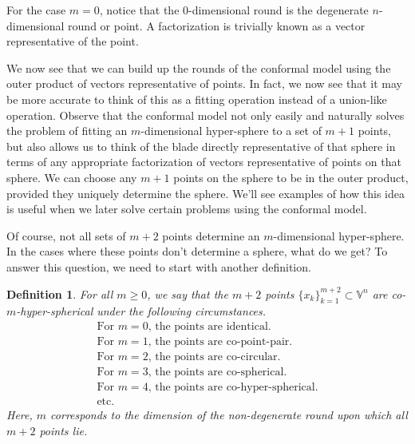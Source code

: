 \documentclass[12pt]{article}
\newcommand{\V}{\mathbb{V}}
\newtheorem{definition}{Definition}[section]
\begin{document}
For the case $m=0$, notice that the 0-dimensional round is the degenerate $n$-dimensional round
or point.  A factorization is trivially known as a vector representative of the point.

We now see that we can build up the rounds of the conformal model using
the outer product of vectors representative of points.  In fact, we now see
that it may be more accurate to think of this as a fitting operation instead of
a union-like operation.  Observe that the conformal model not only easily and
naturally solves the problem of fitting an $m$-dimensional hyper-sphere
to a set of $m+1$ points, but also allows us to think of the blade directly
representative of that sphere in terms of any appropriate factorization
of vectors representative of points on that sphere.  We
can choose any $m+1$ points on the sphere to be in the outer product, provided they uniquely
determine the sphere.  We'll see examples of how this idea is
useful when we later solve certain problems using the conformal model.

Of course, not all sets of $m+2$ points determine
an $m$-dimensional hyper-sphere.  In the cases where these points don't determine a sphere, what do
we get?  To answer this question, we need to start with another definition.
\begin{definition}
For all $m\geq 0$, we say that the $m+2$ points $\{x_k\}_{k=1}^{m+2}\subset\V^n$
are co-$m$-hyper-spherical under the following circumstances.
\begin{equation*}
\begin{array}{l}
\mbox{For $m=0$, the points are identical.} \\
\mbox{For $m=1$, the points are co-point-pair.} \\
\mbox{For $m=2$, the points are co-circular.} \\
\mbox{For $m=3$, the points are co-spherical.} \\
\mbox{For $m=4$, the points are co-hyper-spherical.} \\
\mbox{etc.}
\end{array}
\end{equation*}
Here, $m$ corresponds to the dimension of the non-degenerate round upon
which all $m+2$ points lie.
\end{definition}
\end{document}
